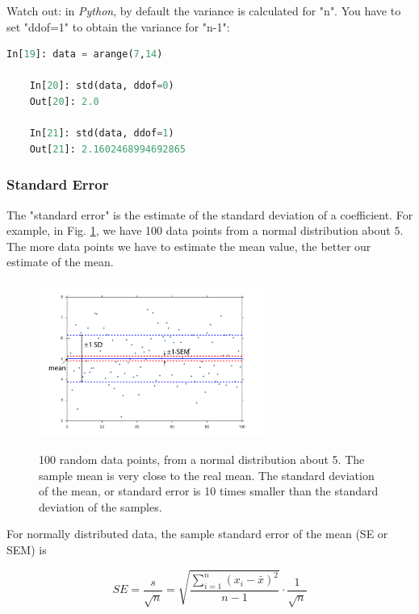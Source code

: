 Watch out: in \emph{Python}, by default the variance is calculated for "n". You have to set "ddof=1" to obtain the variance for "n-1":

\begin{lstlisting}[language=Python]
    In[19]: data = arange(7,14)

    In[20]: std(data, ddof=0)
    Out[20]: 2.0

    In[21]: std(data, ddof=1)
    Out[21]: 2.1602468994692865
\end{lstlisting}

\subsubsection{Standard Error} 

The "standard error" is the estimate of the standard deviation of a coefficient. For example, in Fig. \ref{fig:sem}, we have 100 data points from a normal distribution about $5$. The more data points we have to estimate the mean value, the better our estimate of the mean.

\begin{figure}[ht]
  \centering
  \includegraphics[width=0.66\textwidth]{../Images/standardError.jpg}\\
  \caption{100 random data points, from a normal distribution about 5. The sample mean is very close to the real mean. The standard deviation of the mean, or standard error is 10 times smaller than the standard deviation of the samples.}
  \label{fig:sem}
\end{figure}

For normally distributed data, the sample standard error of the mean (SE or SEM) is

\begin{equation}
  SE = \frac{s}{\sqrt{n}} = \sqrt{\frac{{\sum\limits_{i = 1}^n {({x_i-\bar{x}})^2} }}{n-1}} \cdot \frac{1}{\sqrt{n}}
\end{equation}

